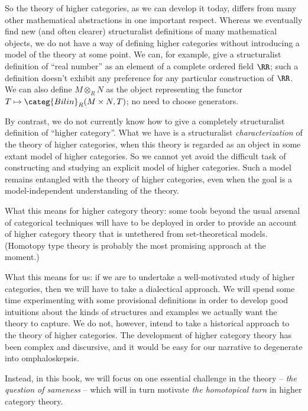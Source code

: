 So the theory of higher categories, as we can develop it today, differs from many other mathematical abstractions in one important respect.
Whereas we eventually find new (and often clearer) structuralist definitions of many mathematical objects,
we do not have a way of defining higher categories without introducing a model of the theory at some point.
We can, for example, give a structuralist definition of \enquote{real number} as an element of a complete ordered field $\RR$;
such a definition doesn't exhibit any preference for any particular construction of $\RR$.
We can also define $M \otimes_R N$ as the object representing the functor $T \mapsto \categ{Bilin}_R(M \times N, T)$;
no need to choose generators.

By contrast, we do not currently know how to give a completely structuralist definition of \enquote{higher category}.
What we have is a structuralist \emph{characterization} of the theory of higher categories, when this theory is regarded as an object in some extant model of higher categories.
So we cannot yet avoid the difficult task of constructing and studying an explicit model of higher categories.
Such a model remains entangled with the theory of higher categories,
even when the goal is a model-independent understanding of the theory.

What this means for higher category theory:
some tools beyond the usual arsenal of categorical techniques will have to be deployed in order to provide an account of higher category theory that is untethered from set-theoretical models.
(Homotopy type theory is probably the most promising approach at the moment.)

What this means for us:
if we are to undertake a well-motivated study of higher categories, then
we will have to take a dialectical approach.
We will spend some time experimenting with some provisional definitions in order to develop good intuitions about the kinds of structures and examples we actually want the theory to capture.
We do not, however, intend to take a historical approach to the theory of higher categories.
The development of higher category theory has been complex and discursive, and
it would be easy for our narrative to degenerate into omphaloskepsis.

Instead, in this book, we will focus on one essential challenge in the theory -- \emph{the question of sameness} -- which will in turn motivate \emph{the homotopical turn} in higher category theory.









